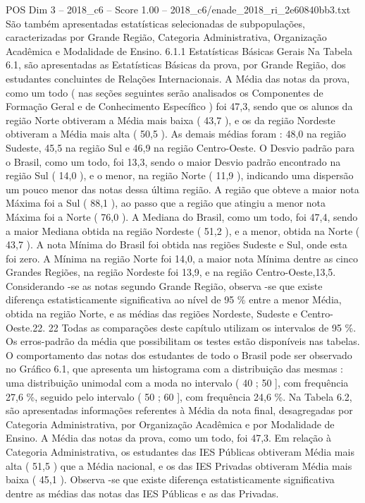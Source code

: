 \begin{textsample}{POS Dim 3 – 2018\_c6 – Score 1.00 – 2018\_c6/enade\_2018\_ri\_2e60840bb3.txt}
São também apresentadas estatísticas selecionadas de subpopulações, caracterizadas por Grande Região, Categoria Administrativa, Organização Acadêmica e Modalidade de Ensino. 6.1.1 Estatísticas Básicas Gerais Na Tabela 6.1, são apresentadas as Estatísticas Básicas da prova, por Grande Região, dos estudantes concluintes de Relações Internacionais.
A Média das notas da prova, como um todo ( nas seções seguintes serão analisados os Componentes de Formação Geral e de Conhecimento Específico ) foi 47,3, sendo que os alunos da região Norte obtiveram a Média mais baixa ( 43,7 ), e os da região Nordeste obtiveram a Média mais alta ( 50,5 ).
As demais médias foram : 48,0 na região Sudeste, 45,5 na região Sul e 46,9 na região Centro-Oeste.
O Desvio padrão para o Brasil, como um todo, foi 13,3, sendo o maior Desvio padrão encontrado na região Sul ( 14,0 ), e o menor, na região Norte ( 11,9 ), indicando uma dispersão um pouco menor das notas dessa última região.
A região que obteve a maior nota Máxima foi a Sul ( 88,1 ), ao passo que a região que atingiu a menor nota Máxima foi a Norte ( 76,0 ).
A Mediana do Brasil, como um todo, foi 47,4, sendo a maior Mediana obtida na região Nordeste ( 51,2 ), e a menor, obtida na Norte ( 43,7 ).
A nota Mínima do Brasil foi obtida nas regiões Sudeste e Sul, onde esta foi zero.
A Mínima na região Norte foi 14,0, a maior nota Mínima dentre as cinco Grandes Regiões, na região Nordeste foi 13,9, e na região Centro-Oeste,13,5.
Considerando -se as notas segundo Grande Região, observa -se que existe diferença estatisticamente significativa ao nível de 95 \% entre a menor Média, obtida na região Norte, e as médias das regiões Nordeste, Sudeste e Centro-Oeste.22. 22 Todas as comparações deste capítulo utilizam os intervalos de 95 \%.
Os erros-padrão da média que possibilitam os testes estão disponíveis nas tabelas.
O comportamento das notas dos estudantes de todo o Brasil pode ser observado no Gráfico 6.1, que apresenta um histograma com a distribuição das mesmas : uma distribuição unimodal com a moda no intervalo ( 40 ; 50 ], com frequência 27,6 \%, seguido pelo intervalo ( 50 ; 60 ], com frequência 24,6 \%.
Na Tabela 6.2, são apresentadas informações referentes à Média da nota final, desagregadas por Categoria Administrativa, por Organização Acadêmica e por Modalidade de Ensino.
A Média das notas da prova, como um todo, foi 47,3.
Em relação à Categoria Administrativa, os estudantes das IES Públicas obtiveram Média mais alta ( 51,5 ) que a Média nacional, e os das IES Privadas obtiveram Média mais baixa ( 45,1 ).
Observa -se que existe diferença estatisticamente significativa dentre as médias das notas das IES Públicas e as das Privadas.

\end{textsample}
